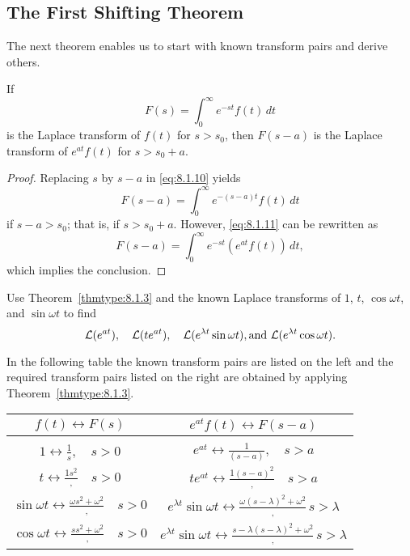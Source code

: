 \documentclass{ximera}
\begin{document}
\subsection*{The First Shifting Theorem}

The next theorem enables us to start with known transform pairs and derive
others. 

\begin{theorem}\label{thmtype:8.1.3}
 If
\begin{equation}\label{eq:8.1.10}
F(s)=\int_0^\infty e^{-st} f(t)\,dt
\end{equation}
is the Laplace transform of $f(t)$ for $s>s_0$, then $F(s-a)$ is the
Laplace transform of $e^{at}f(t)$ for $s >s_0+a$.
\end{theorem}

\begin{proof}
Replacing $s$ by $s-a$ in  \eqref{eq:8.1.10} yields
\begin{equation}\label{eq:8.1.11}
F(s-a)=\int_0^\infty e^{-(s-a)t}f(t)\,dt
\end{equation}
if $s-a>s_0$; that is, if $s>s_0+a$.  However,  \eqref{eq:8.1.11} can
be rewritten as
$$
F(s-a)=\int_0^\infty e^{-st}\left(e^{at}f(t)\right)\,dt,
$$
which implies the conclusion.
\end{proof}

\begin{example}\label{example:8.1.7}
  Use Theorem~\ref{thmtype:8.1.3} and the known Laplace
transforms of $1$, $t$, $\cos\omega t$, and $\sin\omega t$ to find
$$
{\cal L}(e^{at}),\quad {\cal L}(te^{at}),\quad {\cal L}(e^{\lambda t}\sin
\omega t),\mbox{and } {\cal L}(e^{\lambda t}\cos\omega t).
$$
\begin{explanation}
In the following table the known
transform pairs  are listed on the left and  the required  transform pairs
listed on the right are obtained  by applying
Theorem~\ref{thmtype:8.1.3}.

\begin{center}
\begin{tabular}{|c|c|}\hline
$f(t)\leftrightarrow F(s)$ & $e^{at}f(t)\leftrightarrow F(s-a)$ \\\hline
&\\ $1\leftrightarrow\frac{1}{s},\quad s>0$ &
 $e^{at}\leftrightarrow\frac{1}{(s-a)},\quad s>a$\\
  $t\leftrightarrow\frac{{1}{s^2}},\quad s>0$ &
$te^{at}\leftrightarrow\frac{{1}{(s-a)^2}},\quad s>a$\\
$\sin\omega t\leftrightarrow\frac{{\omega}{s^2+\omega^2}},\quad s>0$&
$e^{\lambda t}\sin\omega t\leftrightarrow\frac{{\omega}{(s-\lambda)^2+\omega^2}},\,s>\lambda$\\
$\cos\omega t\leftrightarrow\frac{{s}{s^2+\omega^2}},\quad s>0$ &
$e^{\lambda t}\sin\omega t\leftrightarrow\frac{{s-\lambda}{(s-\lambda)^2+\omega^2}},\,s>\lambda$\\\hline
\end{tabular}
\end{center}
\end{explanation}
\end{example}
\end{document}
